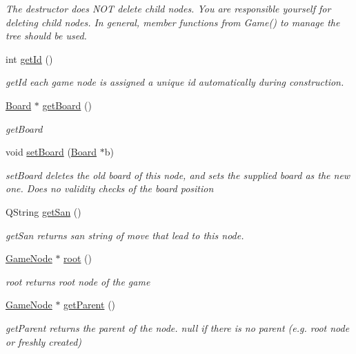 \begin{DoxyCompactItemize}
\begin{DoxyCompactList}\small\item\em The destructor does N\-O\-T delete child nodes. You are responsible yourself for deleting child nodes. In general, member functions from Game() to manage the tree should be used. \end{DoxyCompactList}\item 
int \hyperlink{classchess_1_1GameNode_a8ca2222d9ea74fa3c3e581b90b446f20}{get\-Id} ()
\begin{DoxyCompactList}\small\item\em get\-Id each game node is assigned a unique id automatically during construction. \end{DoxyCompactList}\item 
\hyperlink{classchess_1_1Board}{Board} $\ast$ \hyperlink{classchess_1_1GameNode_a68758d5555d7e01f13dd7e5685fa7fdc}{get\-Board} ()
\begin{DoxyCompactList}\small\item\em get\-Board \end{DoxyCompactList}\item 
void \hyperlink{classchess_1_1GameNode_a285593d02086c1c6bb30c852b0b41d5f}{set\-Board} (\hyperlink{classchess_1_1Board}{Board} $\ast$b)
\begin{DoxyCompactList}\small\item\em set\-Board deletes the old board of this node, and sets the supplied board as the new one. Does no validity checks of the board position \end{DoxyCompactList}\item 
Q\-String \hyperlink{classchess_1_1GameNode_aa56312861ca85710a7979b66427fd1cd}{get\-San} ()
\begin{DoxyCompactList}\small\item\em get\-San returns san string of move that lead to this node. \end{DoxyCompactList}\item 
\hyperlink{classchess_1_1GameNode}{Game\-Node} $\ast$ \hyperlink{classchess_1_1GameNode_a3893ddd950c675600e030d8e3817e48a}{root} ()
\begin{DoxyCompactList}\small\item\em root returns root node of the game \end{DoxyCompactList}\item 
\hyperlink{classchess_1_1GameNode}{Game\-Node} $\ast$ \hyperlink{classchess_1_1GameNode_ac35bd1ef7f0ba9ce43306d224d9b6839}{get\-Parent} ()
\begin{DoxyCompactList}\small\item\em get\-Parent returns the parent of the node. null if there is no parent (e.\-g. root node or freshly created) \end{DoxyCompactList}\item 

\end{DoxyCompactItemize}
